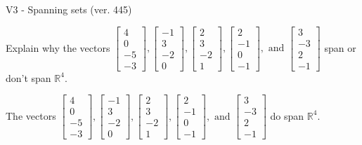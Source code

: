 \begin{exercise}
  \begin{exerciseTitle}V3 - Spanning sets (ver. 445)\end{exerciseTitle}
  \begin{exerciseStatement}
    Explain why the vectors \(\left[\begin{array}{r}
4 \\
0 \\
-5 \\
-3
\end{array}\right] , \left[\begin{array}{r}
-1 \\
3 \\
-2 \\
0
\end{array}\right] , \left[\begin{array}{r}
2 \\
3 \\
-2 \\
1
\end{array}\right] , \left[\begin{array}{r}
2 \\
-1 \\
0 \\
-1
\end{array}\right] , \text{ and } \left[\begin{array}{r}
3 \\
-3 \\
2 \\
-1
\end{array}\right]\) span or don't span \(\mathbb{R}^4\). 
	


  \end{exerciseStatement}
  \begin{exerciseAnswer}
   The vectors \(\left[\begin{array}{r}
4 \\
0 \\
-5 \\
-3
\end{array}\right] , \left[\begin{array}{r}
-1 \\
3 \\
-2 \\
0
\end{array}\right] , \left[\begin{array}{r}
2 \\
3 \\
-2 \\
1
\end{array}\right] , \left[\begin{array}{r}
2 \\
-1 \\
0 \\
-1
\end{array}\right] , \text{ and } \left[\begin{array}{r}
3 \\
-3 \\
2 \\
-1
\end{array}\right]\) 
  	 do  
	span \(\mathbb{R}^4\).
  



\end{exerciseAnswer}
\end{exercise}
